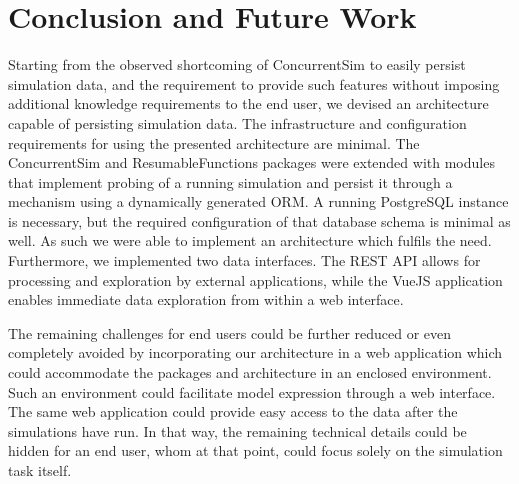 \documentclass{juliacon}
\begin{document}
\section{Conclusion and Future Work}

Starting from the observed shortcoming of ConcurrentSim to easily persist simulation data, and the requirement to provide such features without imposing additional knowledge requirements to the end user, we devised an architecture capable of persisting simulation data. The infrastructure and configuration requirements for using the presented architecture are minimal. The ConcurrentSim and ResumableFunctions packages were extended with modules that implement probing of a running simulation and persist it through a mechanism using a dynamically generated ORM. A running PostgreSQL instance is necessary, but the required configuration of that database schema is minimal as well. As such we were able to implement an architecture which fulfils the need. Furthermore, we implemented two data interfaces. The REST API allows for processing and exploration by external applications, while the VueJS application enables immediate data exploration from within a web interface. \vskip 6pt

The remaining challenges for end users could be further reduced or even completely avoided by incorporating our architecture in a web application which could accommodate the packages and architecture in an enclosed environment. Such an environment could facilitate model expression through a web interface. The same web application could provide easy access to the data after the simulations have run. In that way, the remaining technical details could be hidden for an end user, whom at that point, could focus solely on the simulation task itself. \vskip 6pt




%
\end{document}
